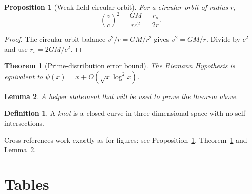 \documentclass[11pt,a4paper]{article}
\newtheorem{proposition}{Proposition}
\newtheorem{theorem}{Theorem}[section]
\newtheorem{lemma}[theorem]{Lemma}          %
\theoremstyle{definition}                   %
\newtheorem{definition}{Definition}
\begin{document}
\begin{proposition}[Weak-field circular orbit]
\label{prop:circular}
For a circular orbit of radius $r$,
\[ \left( \frac{v}{c} \right)^2 = \frac{GM}{rc^2} = \frac{r_s}{2r}. \]
\end{proposition}

\begin{proof}
The circular-orbit balance $v^2/r = GM/r^2$ gives $v^2 = GM/r$.
Divide by $c^2$ and use $r_s = 2GM/c^2$.
\end{proof}

\begin{theorem}[Prime-distribution error bound]
\label{thm:rh}
The Riemann Hypothesis is equivalent to
$\psi(x) = x + O\!\left(\sqrt{x}\log^2 x\right)$.
\end{theorem}

\begin{lemma}
\label{lem:helper}
A helper statement that will be used to prove the theorem above.
\end{lemma}

\begin{definition}
A \emph{knot} is a closed curve in three-dimensional space with no
self-intersections.
\end{definition}

Cross-references work exactly as for figures:
see Proposition~\ref{prop:circular}, Theorem~\ref{thm:rh}
and Lemma~\ref{lem:helper}.


\section{Tables}
%
%
%
\end{document}
